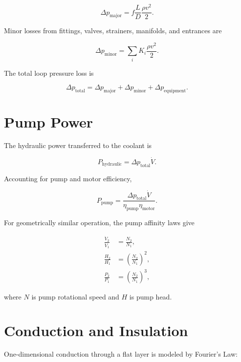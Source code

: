 \documentclass[11pt]{article}
\begin{document}
\begin{equation}
\Delta p_{\mathrm{major}}
=f\frac{L}{D}\frac{\rho v^2}{2}.
\label{eq:darcy}
\end{equation}

Minor losses from fittings, valves, strainers, manifolds, and entrances are

\begin{equation}
\Delta p_{\mathrm{minor}}
=\sum_i K_i\frac{\rho v^2}{2}.
\end{equation}

The total loop pressure loss is

\begin{equation}
\Delta p_{\mathrm{total}}
=\Delta p_{\mathrm{major}}
+\Delta p_{\mathrm{minor}}
+\Delta p_{\mathrm{equipment}}.
\end{equation}

\section{Pump Power}

The hydraulic power transferred to the coolant is

\begin{equation}
P_{\mathrm{hydraulic}}=\Delta p_{\mathrm{total}}\dot V.
\end{equation}

Accounting for pump and motor efficiency,

\begin{equation}
P_{\mathrm{pump}}
=\frac{\Delta p_{\mathrm{total}}\dot V}
{\eta_{\mathrm{pump}}\eta_{\mathrm{motor}}}.
\label{eq:pump}
\end{equation}

For geometrically similar operation, the pump affinity laws give

\begin{align}
\frac{\dot V_2}{\dot V_1}&=\frac{N_2}{N_1},\\
\frac{H_2}{H_1}&=\left(\frac{N_2}{N_1}\right)^2,\\
\frac{P_2}{P_1}&=\left(\frac{N_2}{N_1}\right)^3,
\end{align}

where \(N\) is pump rotational speed and \(H\) is pump head.

\section{Conduction and Insulation}

One-dimensional conduction through a flat layer is modeled by Fourier's Law:
\end{document}

